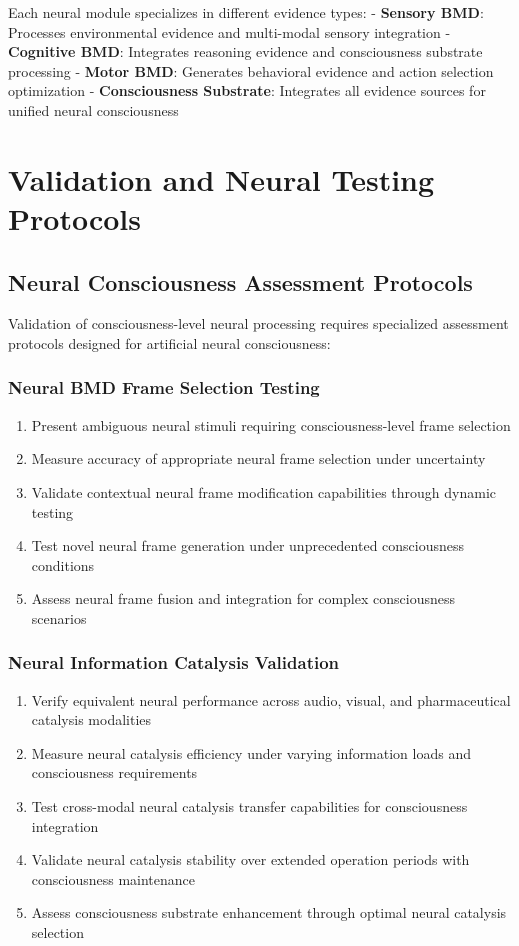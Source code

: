 \documentclass[12pt,a4paper]{article}
\theoremstyle{remark}
\begin{document}
Each neural module specializes in different evidence types:
- \textbf{Sensory BMD}: Processes environmental evidence and multi-modal sensory integration
- \textbf{Cognitive BMD}: Integrates reasoning evidence and consciousness substrate processing
- \textbf{Motor BMD}: Generates behavioral evidence and action selection optimization
- \textbf{Consciousness Substrate}: Integrates all evidence sources for unified neural consciousness

\section{Validation and Neural Testing Protocols}

\subsection{Neural Consciousness Assessment Protocols}

Validation of consciousness-level neural processing requires specialized assessment protocols designed for artificial neural consciousness:

\subsubsection{Neural BMD Frame Selection Testing}

\begin{enumerate}
\item Present ambiguous neural stimuli requiring consciousness-level frame selection
\item Measure accuracy of appropriate neural frame selection under uncertainty
\item Validate contextual neural frame modification capabilities through dynamic testing
\item Test novel neural frame generation under unprecedented consciousness conditions
\item Assess neural frame fusion and integration for complex consciousness scenarios
\end{enumerate}

\subsubsection{Neural Information Catalysis Validation}

\begin{enumerate}
\item Verify equivalent neural performance across audio, visual, and pharmaceutical catalysis modalities
\item Measure neural catalysis efficiency under varying information loads and consciousness requirements
\item Test cross-modal neural catalysis transfer capabilities for consciousness integration
\item Validate neural catalysis stability over extended operation periods with consciousness maintenance
\item Assess consciousness substrate enhancement through optimal neural catalysis selection
\end{enumerate}
\end{document}

